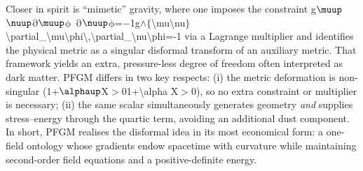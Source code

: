 \documentclass{iopjournal}
\begin{document}
Closer in spirit is ``mimetic'' gravity, where one imposes the constraint g$\muup$$\nuup$$\mathrm{\partial}$$\muup$$\mathrm{\phi}$\ $\mathrm{\partial}$$\nuup$$\mathrm{\phi}$=$\mathrm{-}$1g$\mathrm{\wedge}$$\mathrm{\{}${\textbackslash}mu{\textbackslash}nu$\mathrm{\}}${\textbackslash}partial\_{\textbackslash}mu{\textbackslash}phi{\textbackslash},{\textbackslash}partial\_{\textbackslash}nu{\textbackslash}phi=-1 via a Lagrange multiplier and identifies the physical metric as a singular disformal transform of an auxiliary metric. That framework yields an extra, pressure-less degree of freedom often interpreted as dark matter. PFGM differs in two key respects: (i) the metric deformation is non-singular (1+$\alphaup$X$\mathrm{>}$01+{\textbackslash}alpha X$\mathrm{>}$0), so no extra constraint or multiplier is necessary; (ii) the same scalar simultaneously generates geometry \textit{and} supplies stress--energy through the quartic term, avoiding an additional dust component. In short, PFGM realises the disformal idea in its most economical form: a one-field ontology whose gradients endow spacetime with curvature while maintaining second-order field equations and a positive-definite energy.
\end{document}
